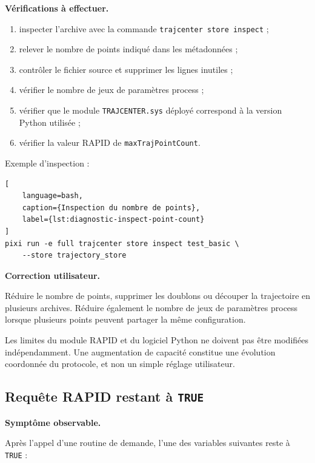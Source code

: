 \documentclass{rapportENSAM}
\begin{document}
\textbf{Vérifications à effectuer.}

\begin{enumerate}
    \item inspecter l'archive avec la commande
    \texttt{trajcenter store inspect} ;
    \item relever le nombre de points indiqué dans les métadonnées ;
    \item contrôler le fichier source et supprimer les lignes inutiles ;
    \item vérifier le nombre de jeux de paramètres process ;
    \item vérifier que le module \texttt{TRAJCENTER.sys} déployé correspond à
    la version Python utilisée ;
    \item vérifier la valeur RAPID de \texttt{maxTrajPointCount}.
\end{enumerate}

Exemple d'inspection :

\begin{lstlisting}[
    language=bash,
    caption={Inspection du nombre de points},
    label={lst:diagnostic-inspect-point-count}
]
pixi run -e full trajcenter store inspect test_basic \
    --store trajectory_store
\end{lstlisting}

\textbf{Correction utilisateur.}

Réduire le nombre de points, supprimer les doublons ou découper la trajectoire
en plusieurs archives. Réduire également le nombre de jeux de paramètres
process lorsque plusieurs points peuvent partager la même configuration.

Les limites du module RAPID et du logiciel Python ne doivent pas être modifiées
indépendamment. Une augmentation de capacité constitue une évolution
coordonnée du protocole, et non un simple réglage utilisateur.


\subsection{Requête RAPID restant à \texttt{TRUE}}
\label{subsec:diagnostic-request-stuck}

\textbf{Symptôme observable.}

Après l'appel d'une routine de demande, l'une des variables suivantes reste à
\texttt{TRUE} :
\end{document}
